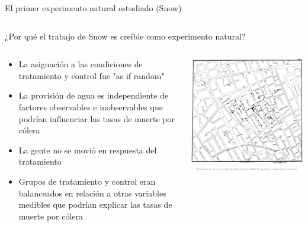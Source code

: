 \documentclass[
  ignorenonframetext,
]{beamer}
\begin{document}
\begin{frame}{El primer experimento natural estudiado (Snow)}
\begin{columns}
\begin{column}{0.2\textwidth}
\end{column}
\end{columns}
\end{frame}

\begin{frame}{¿Por qué el trabajo de Snow es creíble como experimento
natural?}
\protect\hypertarget{por-quuxe9-el-trabajo-de-snow-es-creuxedble-como-experimento-natural}{}
\begin{columns}
\begin{column}{0.6\textwidth}
\begin{itemize}
\item La asignación a las condiciones de tratamiento y control fue "as if random"
\item La provisión de agua es independiente de factores observables e inobservables que podrían influenciar las tasas de muerte por cólera
\item La gente no se movió en respuesta del tratamiento
\item Grupos de tratamiento y control eran balanceados en relación a otras variables medibles que podrían explicar las tasas de muerte por cólera
\end{itemize}
\end{column}
\begin{column}{0.4\textwidth}
\includegraphics[width=\textwidth]{figs/map_snow.png}
\end{column}
\end{columns}
\end{frame}
\end{document}
